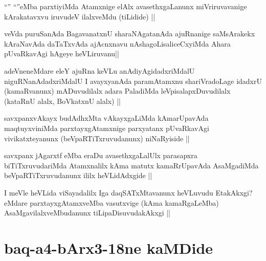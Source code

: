 
\begin{artha}
``\stext'' ``\stext''eMba parxtiyiMda Atamxnige elAlx avasethxgaLanunx miVriruvavanige kArakatavxvu iruvudeV ilalxveMdu (tiLidide) ||
\end{artha}


\begin{artha}
veVda puruSanAda BagavanatxnU sharaNAgatanAda ajuRnanige saMsArakekx kAraNavAda daTaTxvAda ajAcnxnavu nAshagoLisaliceCxyiMda Ahara pUvaRkavAgi hAgeye heVLiruvanu||
\end{artha}

\begin{artha}
adeVneneMdare eleY ajuRna keVLu anAdiyAgidadxriMdalU niguRNanAdadxriMdalU I avayxyanAda paramAtamxnu shariVradoLage idadxrU (kamaRvanunx) mADuvudilalx adara PaladiMda leVpisalapxDuvudilalx (kataRnU alalx, BoVkatxnU alalx) ||
\end{artha}


\begin{artha}
savxpanxvAkayx budAdhxMta vAkayxgaLiMda kAmarUpavAda maqtuyxviniMda parxtayxgAtamxnige parxyatanx pUvaRkavAgi vivikatxteyanunx (beVpaRTiTxruvudanunx) niNaRyiside ||
\end{artha}


\begin{artha}
savxpanx jAgarxtf eMba eraDu avasethxgaLalUlx parasapxra biTiTxruvudariMda Atamxnalilx kAma matutx kamaRrUpavAda AsaMgadiMda beVpaRTiTxruvudanunx ililx heVLidAdxgide ||
\end{artha}

\begin{artha}
I meVle heVLida viSayadalilx Iga daqSATxMtavanunx heVLuvudu EtakAkxgi? eMdare parxtayxgAtamxveMba vasutxvige (kAma kamaRgaLeMba) AsaMgavilalxveMbudanunx tiLipaDisuvudakAkxgi ||
\end{artha}

\section*{baq-a4-bArx3-18ne kaMDide}


